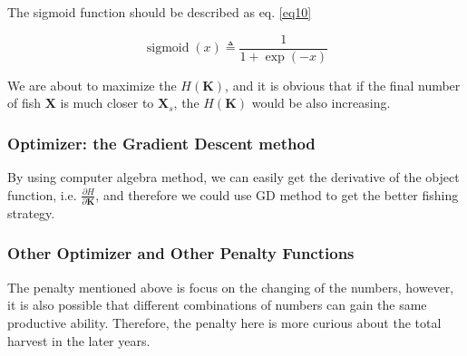 \documentclass{IEEEtran}
\DeclareMathOperator*{\sigmoid}{sigmoid}
\begin{document}
The sigmoid function should be described as eq. \ref{eq10}

\begin{equation}
    \label{eq10}
    \sigmoid(x) \triangleq \frac1{1 + \exp(-x)}
\end{equation}

We are about to maximize the $H(\bm K)$, and it is obvious that if the final number of fish $\bm X$ is much closer to $\bm X_s$, the $H(\bm K)$ would be also increasing.

\subsubsection{Optimizer: the Gradient Descent method}

By using computer algebra method, we can easily get the derivative of the object function, i.e. $\frac{\partial H}{\partial \bm K}$, and therefore we could use GD method to get the better fishing strategy.

%
%

\subsubsection{Other Optimizer and Other Penalty Functions}

The penalty mentioned above is focus on the changing of the numbers, however, it is also possible that different combinations of numbers can gain the same productive ability. Therefore, the penalty here is more curious about the total harvest in the later years.
\end{document}
